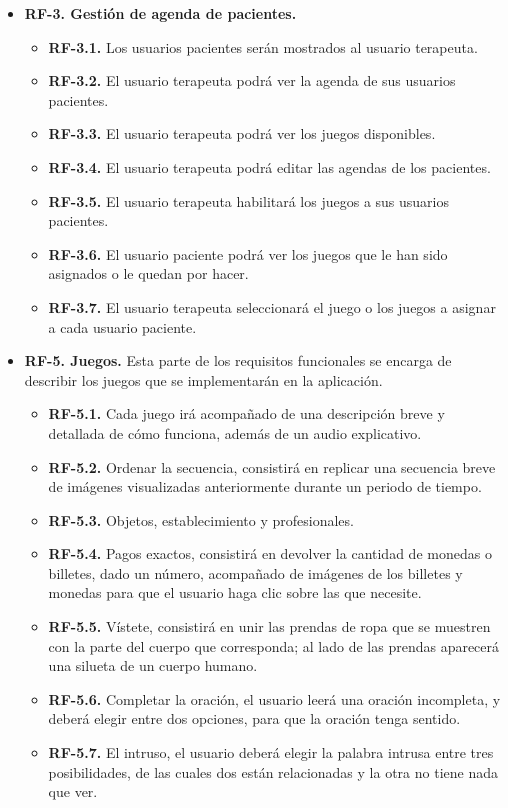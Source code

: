 \begin{itemize}
    \item \textbf{RF-3. Gestión de agenda de pacientes.}
    \begin{itemize}
        \item \textbf{RF-3.1.} Los usuarios pacientes serán mostrados al usuario terapeuta.
        \item \textbf{RF-3.2.} El usuario terapeuta podrá ver la agenda de sus usuarios pacientes.
        \item \textbf{RF-3.3.} El usuario terapeuta podrá ver los juegos disponibles.
        \item \textbf{RF-3.4.} El usuario terapeuta podrá editar las agendas de los pacientes.
        \item \textbf{RF-3.5.} El usuario terapeuta habilitará los juegos a sus usuarios pacientes.
        \item \textbf{RF-3.6.} El usuario paciente podrá ver los juegos que le han sido asignados o le quedan por hacer.
        \item \textbf{RF-3.7.} El usuario terapeuta seleccionará el juego o los juegos a asignar a cada usuario paciente.
    \end{itemize}
    
    \item \textbf{RF-5. Juegos.} 
    Esta parte de los requisitos funcionales se encarga de describir los juegos que se implementarán en la aplicación.
    \begin{itemize}
        \item \textbf{RF-5.1.} Cada juego irá acompañado de una descripción breve y detallada de cómo funciona, además de un audio explicativo.  
        \item \textbf{RF-5.2.} Ordenar la secuencia, consistirá en replicar una secuencia breve de imágenes visualizadas anteriormente durante un periodo de tiempo.
        \item \textbf{RF-5.3.} Objetos, establecimiento y profesionales.
        \item \textbf{RF-5.4.} Pagos exactos, consistirá en devolver la cantidad de monedas o billetes, dado un número, acompañado de imágenes de los billetes y monedas para que el usuario haga clic sobre las que necesite.
        \item \textbf{RF-5.5.} Vístete, consistirá en unir las prendas de ropa que se muestren con la parte del cuerpo que corresponda; al lado de las prendas aparecerá una silueta de un cuerpo humano.
        \item \textbf{RF-5.6.} Completar la oración, el usuario leerá una oración incompleta, y deberá elegir entre dos opciones, para que la oración tenga sentido.
        \item \textbf{RF-5.7.} El intruso, el usuario deberá elegir la palabra intrusa entre tres posibilidades, de las cuales dos están relacionadas y la otra no tiene nada que ver.
    \end{itemize}
    

\end{itemize}
